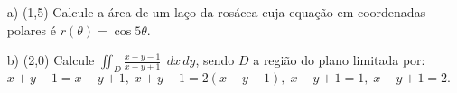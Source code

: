 \documentclass[12pt,a4paper]{article}
\begin{document}


\begin{itemize}
	\item[a)] (1,5) Calcule a área de um laço da rosácea cuja equação em coordenadas polares é $r(\theta) = \cos 5\theta$. \\
	\item[b)] (2,0) Calcule  $\displaystyle\iint_D \frac{x+y-1}{x+y+1}\; \, dx \, dy$, sendo $D$ a região do plano limitada por:
	$$ x+y-1 = x-y+1, \; x+y-1= 2(x-y+1), \; x-y+1=1, \; x-y+1 = 2.$$
	
\end{itemize}


\end{document}
